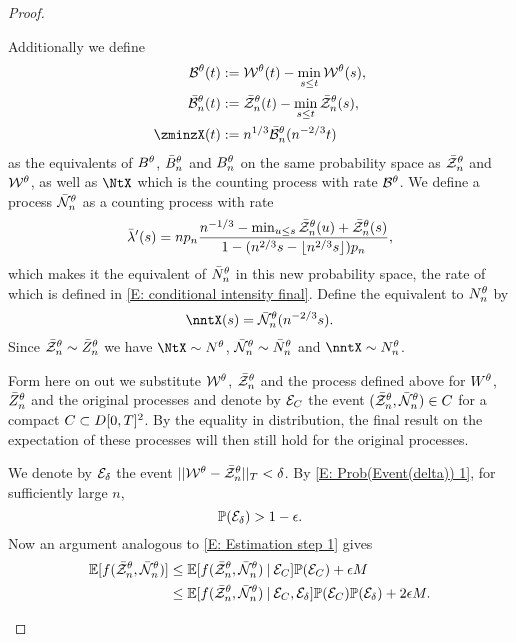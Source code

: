 \begin{proof}
\begin{proofpart}
Additionally we define
\begin{equation}
	\begin{aligned}
	\BtX(t) &:= \WtX(t) - \min_{s \leq t}\WtX(s), \\
	\bar{\mathcal{B}}^{\pp}_n(t) &:= \rzntX(t) - \min_{s \leq t}\rzntX(s), \\
	\zminzX(t) &:= \n{1}{3}\bar{\mathcal{B}}^{\pp}_n(\n{-2}{3}t)	
	\end{aligned}
\end{equation}
as the equivalents of $B^{\theta}$, $\bar{B}_n^{\theta}$ and $B_n^{\theta}$ on the same probability space as $\bar{\mathcal{Z}}^{\theta}_n$ and $\mathcal{W}^{\theta}$,
as well as $\NtX$ which is the counting process with rate $\mathcal{B}^{\theta}$.
We define a process $\bar{\mathcal{N}}_n^{\theta}$ as a counting process with rate
\begin{equation}
\bar{\lambda}'(s) = n p_n \frac{n^{-1 / 3} - \min_{u \leq s} \bar{\mathcal{Z}}^{\theta}_n(u) + \bar{\mathcal{Z}}^{\theta}_n(s)}{1 - (n^{2 / 3}s - \lfloor n^{2 / 3}s\rfloor)p_n},
\end{equation}
which makes it the equivalent of $\bar{N}_n^{\theta}$ in this new probability space, the rate of which is defined in \eqref{E: conditional intensity final}.
Define the equivalent to $N_n^{\theta}$ by 
\begin{equation}
	\nntX(s) = \rnntX(\n{-2}{3}s).
\end{equation}
Since $\bar{\mathcal{Z}}^{\theta}_n \sim \bar{Z}^{\theta}_n$ we have $\NtX \sim \Nt$, $\bar{\mathcal{N}}_n^{\theta} \sim \bar{N}_n^{\theta}$ and $\nntX \sim \nnt$.

Form here on out we substitute $\mathcal{W}^{\theta}$, $\bar{\mathcal{Z}}^{\theta}_n$ and the process defined above for $W^{\theta}$, $\bar{Z}^{\theta}_n$ and the original processes
and denote by $\mathcal{E}_{C}$ the event $(\bar{\mathcal{Z}}^{\theta}_n, \bar{\mathcal{N}}_n^{\theta}) \in C$ for a compact $C \subset D[0, T]^2$.
By the equality in distribution, the final result on the expectation of these processes will then still hold for the original processes.

We denote by $\mathcal{E}_{\delta}$ the event $||\mathcal{W}^{\theta} - \bar{\mathcal{Z}}^{\theta}_n||_T < \delta$.
By \eqref{E: Prob(Event(delta)) 1}, for sufficiently large $n$, 
\begin{equation} \label{E: Prob Event delta}
\mathbb{P}(\mathcal{E}_{\delta}) > 1 - \epsilon.
\end{equation}
Now an argument analogous to \eqref{E: Estimation step 1} gives
\begin{equation} \label{E: Estimation step 2}
\begin{aligned}
\mathbb{E}[f(\bar{\mathcal{Z}}^{\theta}_n, \bar{\mathcal{N}}_n^{\theta}) ] 
&\leq \mathbb{E}[f(\bar{\mathcal{Z}}^{\theta}_n, \bar{\mathcal{N}}_n^{\theta}) \: | \: \mathcal{E}_{C}]\mathbb{P}(\mathcal{E}_{C}) + \epsilon M \\
&\leq \mathbb{E}[f(\bar{\mathcal{Z}}^{\theta}_n, \bar{\mathcal{N}}_n^{\theta}) \: | \: \mathcal{E}_{C}, \mathcal{E}_{\delta}]\mathbb{P}(\mathcal{E}_{C})\mathbb{P}(\mathcal{E}_{\delta}) + 2 \epsilon M.
\end{aligned}
\end{equation}


\end{proofpart}
\end{proof}
